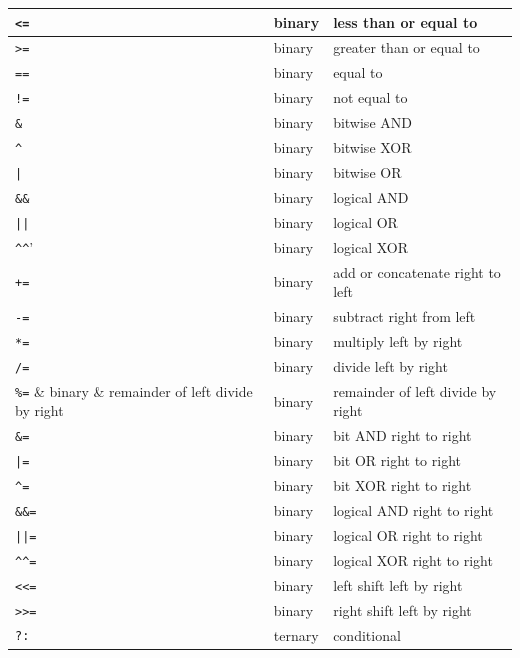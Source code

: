 \begin{tabular}{| l | l | l |}
        \verb'<=' & binary & less than or equal to \\
        \hline
        \verb'>=' & binary & greater than or equal to \\
        \hline
        \verb'==' & binary & equal to \\
        \hline
        \verb'!=' & binary & not equal to \\
        \hline
        \verb'&' & binary & bitwise AND \\
        \hline
        \verb'^' & binary & bitwise XOR \\
        \hline
        \verb'|' & binary & bitwise OR \\
        \hline
        \verb'&&' & binary & logical AND \\
        \hline
        \verb'||' & binary & logical OR \\
        \hline
        \verb'^^' & binary & logical XOR \\
        \hline
        \verb'+=' & binary & add or concatenate right to left \\
        \hline
        \verb'-=' & binary & subtract right from left \\
        \hline
        \verb'*=' & binary & multiply left by right \\
        \hline
        \verb'/=' & binary & divide left by right \\
        \hline
        \verb'%=' & binary & remainder of left divide by right \\
        \hline
        \verb'&=' & binary & bit AND right to right \\
        \hline
        \verb'|=' & binary & bit OR right to right \\
        \hline
        \verb'^=' & binary & bit XOR right to right \\
        \hline
        \verb'&&=' & binary & logical AND right to right \\
        \hline
        \verb'||=' & binary & logical OR right to right \\
        \hline
        \verb'^^=' & binary & logical XOR right to right \\
        \hline
        \verb'<<=' & binary & left shift left by right \\
        \hline
        \verb'>>=' & binary & right shift left by right \\
        \hline
        \verb'?:' & ternary & conditional \\
        \hline
        \end{tabular}
        
